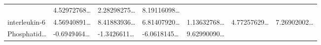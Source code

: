 \documentclass[
]{article}
\begin{document}
\begin{longtable}[]{@{}lllllll@{}}
\begin{minipage}[t]{0.12\columnwidth}
\end{minipage} & \begin{minipage}[t]{0.12\columnwidth}\raggedright
4.52972768\ldots{}\strut
\end{minipage} & \begin{minipage}[t]{0.12\columnwidth}\raggedright
2.28298275\ldots{}\strut
\end{minipage} & \begin{minipage}[t]{0.12\columnwidth}\raggedright
8.19116098\ldots{}\strut
\end{minipage}\tabularnewline
\begin{minipage}[t]{0.12\columnwidth}\raggedright
interleukin-6\strut
\end{minipage} & \begin{minipage}[t]{0.12\columnwidth}\raggedright
4.56940891\ldots{}\strut
\end{minipage} & \begin{minipage}[t]{0.12\columnwidth}\raggedright
8.41883936\ldots{}\strut
\end{minipage} & \begin{minipage}[t]{0.12\columnwidth}\raggedright
6.81407920\ldots{}\strut
\end{minipage} & \begin{minipage}[t]{0.12\columnwidth}\raggedright
1.13632768\ldots{}\strut
\end{minipage} & \begin{minipage}[t]{0.12\columnwidth}\raggedright
4.77257629\ldots{}\strut
\end{minipage} & \begin{minipage}[t]{0.12\columnwidth}\raggedright
7.26902002\ldots{}\strut
\end{minipage}\tabularnewline
\begin{minipage}[t]{0.12\columnwidth}\raggedright
Phosphatid\ldots{}\strut
\end{minipage} & \begin{minipage}[t]{0.12\columnwidth}\raggedright
-0.6949464\ldots{}\strut
\end{minipage} & \begin{minipage}[t]{0.12\columnwidth}\raggedright
-1.3426611\ldots{}\strut
\end{minipage} & \begin{minipage}[t]{0.12\columnwidth}\raggedright
-6.0618145\ldots{}\strut
\end{minipage} & \begin{minipage}[t]{0.12\columnwidth}\raggedright
9.62990090\ldots{}\strut

\end{minipage}
\end{longtable}
\end{document}
